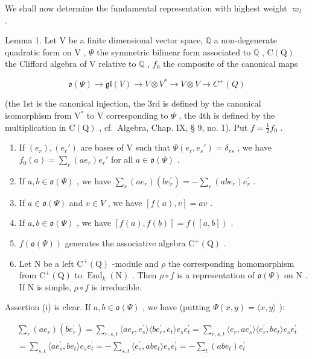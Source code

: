 We shall now determine the fundamental representation with highest weight \(\varpi_{l}\) .

Lemma 1. Let \(\mathrm{V}\) be a finite dimensional vector space, \(\mathbb{Q}\) a non-degenerate quadratic form on \(\mathrm{V}\) , \(\Psi\) the symmetric bilinear form associated to \(\mathbb{Q}\) , \(\mathrm{C(Q)}\) the Clifford algebra of \(\mathrm{V}\) relative to \(\mathbb{Q}\) , \(f_0\) the composite of the canonical maps

\[
\mathfrak {o} (\Psi) \longrightarrow \mathfrak {g l} (V) \longrightarrow V \otimes V ^ {*} \longrightarrow V \otimes V \longrightarrow C ^ {+} (Q)
\]

(the 1st is the canonical injection, the 3rd is defined by the canonical isomorphism from \(\mathrm{V}^*\) to \(\mathrm{V}\) corresponding to \(\Psi\) , the 4th is defined by the multiplication in \(\mathrm{C(Q)}\) , cf.~Algebra, Chap. IX, § 9, no. 1). Put \(f = \frac{1}{2} f_0\) .

\begin{enumerate}
\def\labelenumi{(\roman{enumi})}
\item
  If \((e_r), (e_r')\) are bases of V such that \(\Psi(e_r, e_s') = \delta_{rs}\) , we have \(f_0(a) = \sum_r (ae_r)e_r'\) for all \(a \in \mathfrak{o}(\Psi)\) .
\item
  If \(a, b \in \mathfrak{o}(\Psi)\) , we have \(\sum_{r}(ae_{r})(be_{r}^{\prime}) = -\sum_{r}(abe_{r})e_{r}^{\prime}\) .
\item
  If \(a \in \mathfrak{o}(\varPsi)\) and \(v \in V\) , we have \([f(a), v] = av\) .
\item
  If \(a, b \in \mathfrak{o}(\varPsi)\) , we have \([f(a), f(b)] = f([a, b])\) .
\item
  \(f(\mathfrak{o}(\Psi))\) generates the associative algebra \(\mathrm{C}^{+}(\mathrm{Q})\) .
\item
  Let \(\mathrm{N}\) be a left \(\mathrm{C}^{+}(\mathrm{Q})\) -module and \(\rho\) the corresponding homomorphism from \(\mathrm{C}^{+}(\mathrm{Q})\) to \(\operatorname{End}_k(\mathrm{N})\) . Then \(\rho \circ f\) is a representation of \(\mathfrak{o}(\Psi)\) on \(\mathrm{N}\) . If \(\mathrm{N}\) is simple, \(\rho \circ f\) is irreducible.
\end{enumerate}

Assertion (i) is clear. If \(a, b \in \mathfrak{o}(\varPsi)\) , we have (putting \(\varPsi(x,y) = \langle x,y\rangle\) ):

\[
\begin{array}{c} \sum_ {r} (a e _ {r}) (b e _ {r} ^ {\prime}) = \sum_ {r, s, t} \langle a e _ {r}, e _ {s} ^ {\prime} \rangle \langle b e _ {r} ^ {\prime}, e _ {t} \rangle e _ {s} e _ {t} ^ {\prime} = \sum_ {r, s, t} \langle e _ {r}, a e _ {s} ^ {\prime} \rangle \langle e _ {r} ^ {\prime}, b e _ {t} \rangle e _ {s} e _ {t} ^ {\prime} \\ = \sum_ {s, t} \langle a e _ {s} ^ {\prime}, b e _ {t} \rangle e _ {s} e _ {t} ^ {\prime} = - \sum_ {s, t} \langle e _ {s} ^ {\prime}, a b e _ {t} \rangle e _ {s} e _ {t} ^ {\prime} = - \sum_ {t} (a b e _ {t}) e _ {t} ^ {\prime} \end{array}
\]

